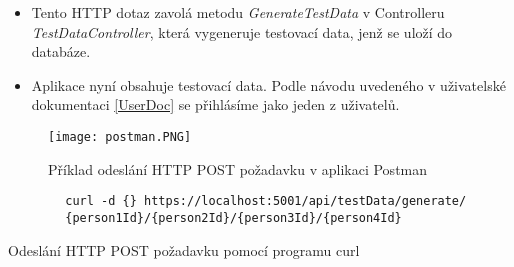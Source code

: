 \begin{itemize}
	\item Tento HTTP dotaz zavolá metodu \textit{GenerateTestData} v Controlleru \textit{TestDataController}, která vygeneruje testovací data, jenž se uloží do databáze. 
	
	\item Aplikace nyní obsahuje testovací data. Podle návodu uvedeného v uživatelské dokumentaci \ref{UserDoc} se přihlásíme jako jeden z uživatelů.
\end{itemize}

\begin{figure}
	\centering
	\texttt{[image: postman.PNG]}
	\caption{Příklad odeslání HTTP POST požadavku v aplikaci Postman}
	\label{fig:Postman}
\end{figure}

\begin{program}
	\begin{lstlisting}
		curl -d {} https://localhost:5001/api/testData/generate/
		{person1Id}/{person2Id}/{person3Id}/{person4Id}
	\end{lstlisting}
	\caption{Odeslání HTTP POST požadavku pomocí programu curl}
	\label{curl}
\end{program}